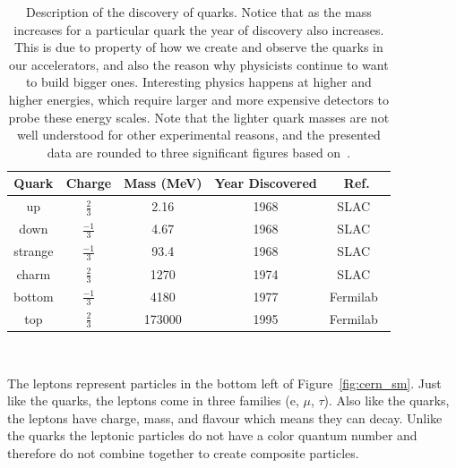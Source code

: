 \begin{table}
\begin{center}
\begin{tabular}{||c c c c c||}
 \hline
 Quark & Charge & Mass (MeV) & Year Discovered & Ref.\\ [0.5ex]
 \hline\hline
 up & $\frac{2}{3}$ & 2.16 & 1968 & SLAC~\citep{1969PhRvL..23..930B, 1969PhRvL..23..935B} \\
 \hline
 down & $\frac{-1}{3}$ & 4.67 & 1968 & SLAC~\citep{1969PhRvL..23..930B, 1969PhRvL..23..935B} \\
 \hline
 strange & $\frac{-1}{3}$ & 93.4 & 1968 & SLAC~\citep{1969PhRvL..23..930B, 1969PhRvL..23..935B} \\
 \hline
 charm & $\frac{2}{3}$ & 1270 & 1974 & SLAC~\citep{Jpsi_PhysRevLett.33.1404} \\
 \hline
 bottom & $\frac{-1}{3}$ & 4180 & 1977 & Fermilab~\citep{bottom_PhysRevLett.39.252}\\
 \hline
 top & $\frac{2}{3}$ & 173000 & 1995 & Fermilab~\citep{topquark_Abachi_1995} \\
 \hline
\end{tabular}
\caption{Description of the discovery of quarks.
  Notice that as the mass increases for a particular quark the year of discovery also increases.
  This is due to property of how we create and observe the quarks in our accelerators, and also the reason why physicists continue to want to build bigger ones.
  Interesting physics happens at higher and higher energies, which require larger and more expensive detectors to probe these energy scales.
  Note that the lighter quark masses are not well understood for other experimental reasons, and the presented data are rounded to three significant figures based on~\citep{Workman:2022ynf}.}
\end{center}
\end{table}
~\label{table:quark}

The leptons represent particles in the bottom left of Figure~\ref{fig:cern_sm}.
Just like the quarks, the leptons come in three families (e, $\mu$, $\tau$).
Also like the quarks, the leptons have charge, mass, and flavour which means they can decay.
Unlike the quarks the leptonic particles do not have a color quantum number and therefore do not combine together to create composite particles.

